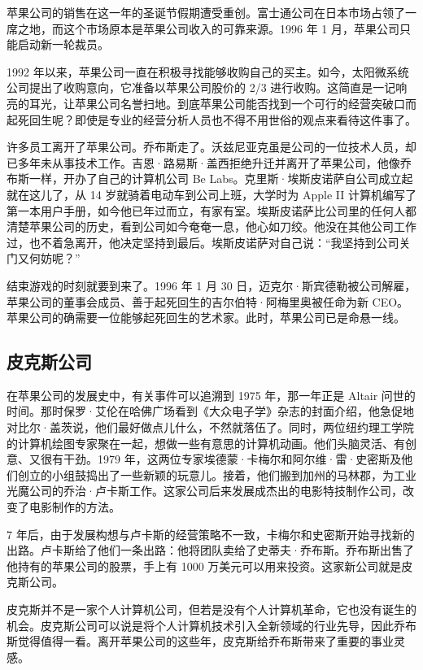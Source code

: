 \documentclass[12pt,UTF8]{ctexbook}
\begin{document}
苹果公司的销售在这一年的圣诞节假期遭受重创。富士通公司在日本市场占领了一席之地，而这个市场原本是苹果公司收入的可靠来源。1996 年 1 月，苹果公司只能启动新一轮裁员。

1992 年以来，苹果公司一直在积极寻找能够收购自己的买主。如今，太阳微系统公司提出了收购意向，它准备以苹果公司股价的 2/3 进行收购。这简直是一记响亮的耳光，让苹果公司名誉扫地。到底苹果公司能否找到一个可行的经营突破口而起死回生呢？即使是专业的经营分析人员也不得不用世俗的观点来看待这件事了。

许多员工离开了苹果公司。乔布斯走了。沃兹尼亚克虽是公司的一位技术人员，却已多年未从事技术工作。吉恩·路易斯·盖西拒绝升迁并离开了苹果公司，他像乔布斯一样，开办了自己的计算机公司 Be Labs。克里斯·埃斯皮诺萨自公司成立起就在这儿了，从 14 岁就骑着电动车到公司上班，大学时为 Apple II 计算机编写了第一本用户手册，如今他已年过而立，有家有室。埃斯皮诺萨比公司里的任何人都清楚苹果公司的历史，看到公司如今奄奄一息，他心如刀绞。他没在其他公司工作过，也不着急离开，他决定坚持到最后。埃斯皮诺萨对自己说：“我坚持到公司关门又何妨呢？”

结束游戏的时刻就要到来了。1996 年 1 月 30 日，迈克尔·斯宾德勒被公司解雇，苹果公司的董事会成员、善于起死回生的吉尔伯特·阿梅里奥被任命为新 CEO。苹果公司的确需要一位能够起死回生的艺术家。此时，苹果公司已是命悬一线。





\subsection{皮克斯公司}


在苹果公司的发展史中，有关事件可以追溯到 1975 年，那一年正是 Altair 问世的时间。那时保罗·艾伦在哈佛广场看到《大众电子学》杂志的封面介绍，他急促地对比尔·盖茨说，他们最好做点儿什么，不然就落伍了。同时，两位纽约理工学院的计算机绘图专家聚在一起，想做一些有意思的计算机动画。他们头脑灵活、有创意、又很有干劲。1979 年，这两位专家埃德蒙·卡梅尔和阿尔维·雷·史密斯及他们创立的小组鼓捣出了一些新颖的玩意儿。接着，他们搬到加州的马林郡，为工业光魔公司的乔治·卢卡斯工作。这家公司后来发展成杰出的电影特技制作公司，改变了电影制作的方法。

7 年后，由于发展构想与卢卡斯的经营策略不一致，卡梅尔和史密斯开始寻找新的出路。卢卡斯给了他们一条出路：他将团队卖给了史蒂夫·乔布斯。乔布斯出售了他持有的苹果公司的股票，手上有 1000 万美元可以用来投资。这家新公司就是皮克斯公司。

皮克斯并不是一家个人计算机公司，但若是没有个人计算机革命，它也没有诞生的机会。皮克斯公司可以说是将个人计算机技术引入全新领域的行业先导，因此乔布斯觉得值得一看。离开苹果公司的这些年，皮克斯给乔布斯带来了重要的事业灵感。
\end{document}
